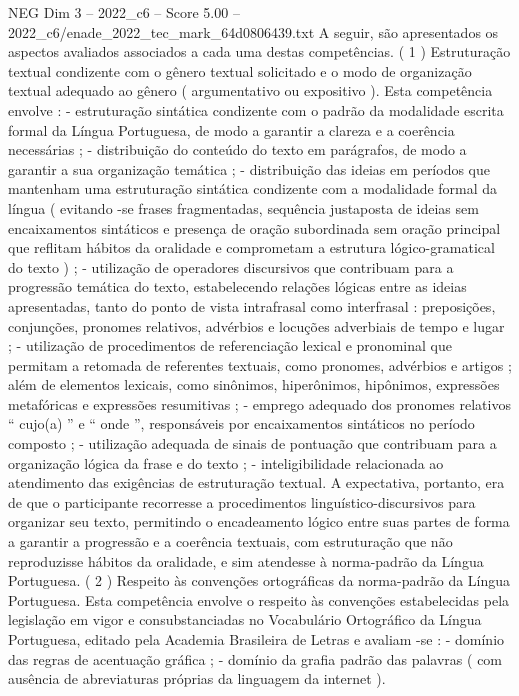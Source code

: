 \begin{textsample}{NEG Dim 3 – 2022\_c6 – Score 5.00 – 2022\_c6/enade\_2022\_tec\_mark\_64d0806439.txt}
A seguir, são apresentados os aspectos avaliados associados a cada uma destas competências. ( 1 ) Estruturação textual condizente com o gênero textual solicitado e o modo de organização textual adequado ao gênero ( argumentativo ou expositivo ).
Esta competência envolve : - estruturação sintática condizente com o padrão da modalidade escrita formal da Língua Portuguesa, de modo a garantir a clareza e a coerência necessárias ; - distribuição do conteúdo do texto em parágrafos, de modo a garantir a sua organização temática ; - distribuição das ideias em períodos que mantenham uma estruturação sintática condizente com a modalidade formal da língua ( evitando -se frases fragmentadas, sequência justaposta de ideias sem encaixamentos sintáticos e presença de oração subordinada sem oração principal que reflitam hábitos da oralidade e comprometam a estrutura lógico-gramatical do texto ) ; - utilização de operadores discursivos que contribuam para a progressão temática do texto, estabelecendo relações lógicas entre as ideias apresentadas, tanto do ponto de vista intrafrasal como interfrasal : preposições, conjunções, pronomes relativos, advérbios e locuções adverbiais de tempo e lugar ; - utilização de procedimentos de referenciação lexical e pronominal que permitam a retomada de referentes textuais, como pronomes, advérbios e artigos ; além de elementos lexicais, como sinônimos, hiperônimos, hipônimos, expressões metafóricas e expressões resumitivas ; - emprego adequado dos pronomes relativos “ cujo(a) ” e “ onde ”, responsáveis por encaixamentos sintáticos no período composto ; - utilização adequada de sinais de pontuação que contribuam para a organização lógica da frase e do texto ; - inteligibilidade relacionada ao atendimento das exigências de estruturação textual.
A expectativa, portanto, era de que o participante recorresse a procedimentos linguístico-discursivos para organizar seu texto, permitindo o encadeamento lógico entre suas partes de forma a garantir a progressão e a coerência textuais, com estruturação que não reproduzisse hábitos da oralidade, e sim atendesse à norma-padrão da Língua Portuguesa. ( 2 ) Respeito às convenções ortográficas da norma-padrão da Língua Portuguesa.
Esta competência envolve o respeito às convenções estabelecidas pela legislação em vigor e consubstanciadas no Vocabulário Ortográfico da Língua Portuguesa, editado pela Academia Brasileira de Letras e avaliam -se : - domínio das regras de acentuação gráfica ; - domínio da grafia padrão das palavras ( com ausência de abreviaturas próprias da linguagem da internet ).

\end{textsample}
